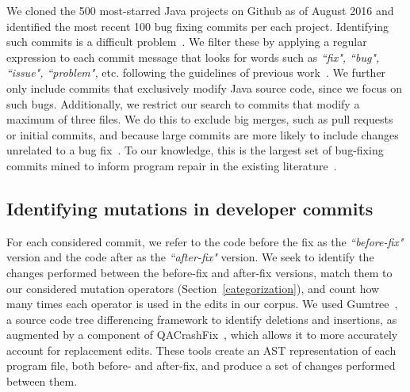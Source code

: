 \documentclass[conference]{IEEEtran}
\begin{document}
We cloned the 500 most-starred Java projects on Github 
as of August 2016 and
identified the most recent 100 bug fixing commits per each project. Identifying
such commits is a difficult
problem~\cite{Bird09}. We filter these by applying a
regular expression to each commit message that looks for words such as \emph{``fix", ``bug", ``issue", ``problem",}
etc. following the guidelines of previous work~\cite{schroter06}.
%
We further only include commits
that exclusively 
modify Java source code, since we focus on such bugs. Additionally, we restrict our search to commits 
that modify a maximum of three files. We do this to exclude
big merges, such as pull requests or initial commits, and because
large commits are more likely to include changes unrelated to a bug fix~\cite{Herzig13,Kawrykow11}.
To our knowledge, this is the largest set of bug-fixing commits mined to inform
program repair in the existing literature~\cite{long16proph,Soto16,zhong15,martinez15,xuan16}. 

\subsection{Identifying mutations in developer commits}
\label{sec:mining}

For each considered commit, we refer to the code before the fix as the
\emph{``before-fix"} version and the code after as the \emph{``after-fix"} version.
We seek to identify the changes performed between the before-fix and
after-fix versions, match them to our considered mutation operators
(Section~\ref{categorization}), and count how many times each operator is used
in the edits in our corpus. 
We used Gumtree~\cite{falleri14}, a source code tree
differencing framework to identify deletions and insertions, as augmented by a
component of QACrashFix~\cite{gao15}, which allows it to more accurately account for
replacement edits. 
These tools create an AST representation of each program file, both before- and after-fix, and produce a set of 
changes performed between them. 
\end{document}
